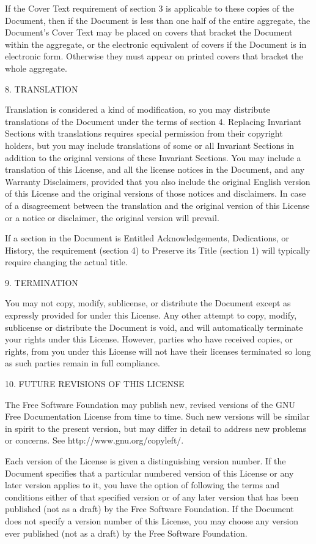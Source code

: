 If the Cover Text requirement of section 3 is applicable to these
copies of the Document, then if the Document is less than one half of
the entire aggregate, the Document's Cover Text may be placed on
covers that bracket the Document within the aggregate, or the
electronic equivalent of covers if the Document is in electronic
form. Otherwise they must appear on printed covers that bracket the
whole aggregate.


8. TRANSLATION 

Translation is considered a kind of modification, so you may
distribute translations of the Document under the terms of section
4. Replacing Invariant Sections with translations requires special
permission from their copyright holders, but you may include
translations of some or all Invariant Sections in addition to the
original versions of these Invariant Sections. You may include a
translation of this License, and all the license notices in the
Document, and any Warranty Disclaimers, provided that you also include
the original English version of this License and the original versions
of those notices and disclaimers. In case of a disagreement between
the translation and the original version of this License or a notice
or disclaimer, the original version will prevail.

If a section in the Document is Entitled
{\textquotedbl}Acknowledgements{\textquotedbl},
{\textquotedbl}Dedications{\textquotedbl}, or
{\textquotedbl}History{\textquotedbl}, the requirement (section 4) to
Preserve its Title (section 1) will typically require changing the
actual title.


9. TERMINATION 

You may not copy, modify, sublicense, or distribute the Document
except as expressly provided for under this License.  Any other
attempt to copy, modify, sublicense or distribute the Document is
void, and will automatically terminate your rights under this
License. However, parties who have received copies, or rights, from
you under this License will not have their licenses terminated so long
as such parties remain in full compliance.


10. FUTURE REVISIONS OF THIS LICENSE 

The Free Software Foundation may publish new, revised versions of the
GNU Free Documentation License from time to time.  Such new versions
will be similar in spirit to the present version, but may differ in
detail to address new problems or concerns. See
http://www.gnu.org/copyleft/.

Each version of the License is given a distinguishing version
number. If the Document specifies that a particular numbered version
of this License {\textquotedbl}or any later version{\textquotedbl}
applies to it, you have the option of following the terms and
conditions either of that specified version or of any later version
that has been published (not as a draft) by the Free Software
Foundation. If the Document does not specify a version number of this
License, you may choose any version ever published (not as a draft) by
the Free Software Foundation.
